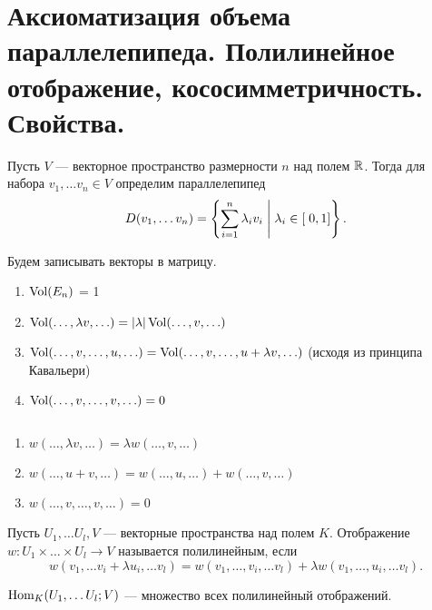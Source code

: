 % 
% 
\section{Аксиоматизация объема параллелепипеда. Полилинейное отображение, кососимметричность. Свойства.}
\begin{defn}[Параллелепипед]
Пусть $ V$ --- векторное пространство размерности  $ n$ над полем $ \mathbb{R}$.  Тогда для набора  $ v_1, \ldots v_n \in V$ определим {\sf параллелепипед}
 \[
     D(v_1, \ldots v_n ) = \left\{ \sum_{i=1}^{n} \lambda_i v_i \Biggm| \lambda_i \in  [\;0, 1] \right\} 
.\] 
\end{defn}
\begin{prop}[Аксиоматизация в $ \R^{n}$ ]
    Будем записывать векторы в матрицу.
    \begin{enumerate}[noitemsep,start=0]
	\item $ \operatorname{Vol}(E_n)$ = 1
	\item $ \operatorname{Vol}(\ldots , \lambda v, \ldots ) = \lvert \lambda \rvert \operatorname{Vol} (\ldots , v, \ldots )$
	\item $ \operatorname{Vol}(\ldots , v , \ldots , u , \ldots ) = \operatorname{Vol}(\ldots , v, \ldots , u + \lambda v, \ldots )$ (исходя из принципа Кавальери)
	\item $ \operatorname{Vol}(\ldots , v, \ldots , v, \ldots ) = 0$
    \end{enumerate}
\end{prop}
\begin{prop}

    $ $
    \begin{enumerate}[noitemsep]
	\item $ w(\ldots , \lambda v, \ldots ) = \lambda w (\ldots , v, \ldots )$
	\item $ w(\ldots , u+v, \ldots ) = w(\ldots , u, \ldots ) + w(\ldots , v, \ldots )$
	\item $ w(\ldots , v, \ldots , v, \ldots ) = 0$
    \end{enumerate}
\end{prop}
\begin{defn}
Пусть $ U_1, \ldots U_l, V$ --- векторные пространства над полем $ K$. Отображение  $ w\colon U_1 \times \ldots \times U_l \to  V$ называется {\sf полилинейным}, если 
\[
    w(v_1, \ldots v_i + \lambda u_i , \ldots v_l) = w(v_1, \ldots , v_i, \ldots  v_l) + \lambda w(v_1, \ldots , u_i, \ldots v_l)
.\] 
\begin{name}
    $ {\mathop{\text{\rm Hom}}}_K(U_1, \ldots U_l; V) $ --- множество всех полилинейный отображений.
\end{name}
\end{defn}

